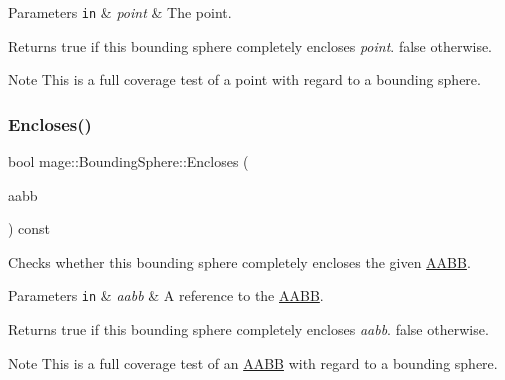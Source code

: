 \begin{DoxyParams}[1]{Parameters}
\mbox{\tt in}  & {\em point} & The point. \\
\hline
\end{DoxyParams}
\begin{DoxyReturn}{Returns}
{\ttfamily true} if this bounding sphere completely encloses {\itshape point}. {\ttfamily false} otherwise. 
\end{DoxyReturn}
\begin{DoxyNote}{Note}
This is a full coverage test of a point with regard to a bounding sphere. 
\end{DoxyNote}
\mbox{\label{classmage_1_1_bounding_sphere_a35feaaaf141319bdf37fca4da0ed0fc0}} 
\subsubsection{\texorpdfstring{Encloses()}{Encloses()}\hspace{0.1cm}{\footnotesize\ttfamily [3/4]}}
{\footnotesize\ttfamily bool mage\+::\+Bounding\+Sphere\+::\+Encloses (\begin{DoxyParamCaption}\item[{const \mbox{\hyperlink{classmage_1_1_a_a_b_b}{A\+A\+BB}} \&}]{aabb }\end{DoxyParamCaption}) const\hspace{0.3cm}{\ttfamily [noexcept]}}

Checks whether this bounding sphere completely encloses the given \mbox{\hyperlink{classmage_1_1_a_a_b_b}{A\+A\+BB}}.


\begin{DoxyParams}[1]{Parameters}
\mbox{\tt in}  & {\em aabb} & A reference to the \mbox{\hyperlink{classmage_1_1_a_a_b_b}{A\+A\+BB}}. \\
\hline
\end{DoxyParams}
\begin{DoxyReturn}{Returns}
{\ttfamily true} if this bounding sphere completely encloses {\itshape aabb}. {\ttfamily false} otherwise. 
\end{DoxyReturn}
\begin{DoxyNote}{Note}
This is a full coverage test of an \mbox{\hyperlink{classmage_1_1_a_a_b_b}{A\+A\+BB}} with regard to a bounding sphere. 
\end{DoxyNote}
\mbox{\label{classmage_1_1_bounding_sphere_ac5989739e15d3525bbb805f9c457ad4d}} 
